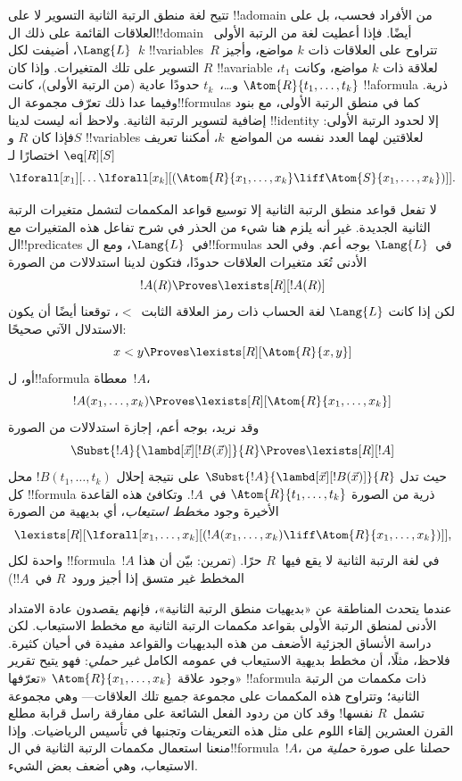 \documentclass[../../../include/open-logic-section]{subfiles}
\begin{document}


تتيح لغة منطق الرتبة الثانية التسوير لا على !!a{domain} من الأفراد
فحسب، بل على العلاقات القائمة على ذلك ال!!{domain} أيضًا. فإذا أعطيت
لغة من الرتبة الأولى~$\Lang{L}$، أضيفت لكل~$k$ !!{variable}s~$R$
تتراوح على العلاقات ذات $k$ مواضع، وأجيز التسوير على تلك المتغيرات. وإذا
كان $R$ !!a{variable} لعلاقة ذات $k$ مواضع، وكانت $t_1$، و\dots،~$t_k$
حدودًا عادية (من الرتبة الأولى)، كانت $\Atom{R}{t_1,\dots,t_k}$
!!a{formula} ذرية. وفيما عدا ذلك تعرّف مجموعة ال!!{formula}s كما في
منطق الرتبة الأولى، مع بنود إضافية لتسوير الرتبة الثانية. ولاحظ أنه
ليست لدينا !!{identity} إلا لحدود الرتبة الأولى: فإذا كان $R$ و$S$
!!{variable}s لعلاقتين لهما العدد نفسه من المواضع~$k$، أمكننا تعريف
$\eq[R][S]$ اختصارًا لـ
\[
\lforall[x_1][\dots\lforall[x_k][(\Atom{R}{x_1, \dots, x_k} \liff
  \Atom{S}{x_1, \dots, x_k})]].
\]

لا تفعل قواعد منطق الرتبة الثانية إلا توسيع قواعد المكممات لتشمل
متغيرات الرتبة الثانية الجديدة. غير أنه يلزم هنا شيء من الحذر في شرح
تفاعل هذه المتغيرات مع ال!!{predicate}s في~$\Lang{L}$، ومع
ال!!{formula}s في~$\Lang{L}$ بوجه أعم. وفي الحد الأدنى تُعَد متغيرات
العلاقات حدودًا، فتكون لدينا استدلالات من الصورة
\[
!A(R) \Proves \lexists[R][!A(R)]
\]
لكن إذا كانت $\Lang{L}$ لغة الحساب ذات رمز العلاقة الثابت~$<$، توقعنا
أيضًا أن يكون الاستدلال الآتي صحيحًا:
\[
x < y \Proves \lexists[R][\Atom{R}{x,y}]
\]
أو، ل!!a{formula} معطاة~$!A$،
\[
!A(x_1, \dots, x_k) \Proves \lexists[R][\Atom{R}{x_1,\dots,x_k}]
\]
وقد نريد، بوجه أعم، إجازة استدلالات من الصورة
\[
\Subst{!A}{\lambd[\vec x][!B(\vec x)]}{R} \Proves
\lexists[R][!A]
\]
حيث تدل $\Subst{!A}{\lambd[\vec x][!B(\vec x)]}{R}$ على نتيجة إحلال
$!B(t_1, \dots, t_k)$ محل كل !!{formula} ذرية من الصورة
$\Atom{R}{t_1,\dots,t_k}$ في~$!A$. وتكافئ هذه القاعدة الأخيرة وجود
{\em مخطط استيعاب}، أي بديهية من الصورة
\[
\lexists[R][\lforall[x_1, \dots, x_k][(!A(x_1, \dots, x_k) \liff
\Atom{R}{x_1, \dots, x_k})]],
\]
واحدة لكل !!{formula}~$!A$ في لغة الرتبة الثانية لا يقع فيها~$R$
حرًا. (تمرين: بيّن أن هذا المخطط غير متسق إذا أجيز ورود~$R$ في~$!A$!)

عندما يتحدث المناطقة عن «بديهيات منطق الرتبة الثانية»، فإنهم يقصدون
عادة الامتداد الأدنى لمنطق الرتبة الأولى بقواعد مكممات الرتبة الثانية
مع مخطط الاستيعاب. لكن دراسة الأنساق الجزئية الأضعف من هذه البديهيات
والقواعد مفيدة في أحيان كثيرة. فلاحظ، مثلًا، أن مخطط بديهية الاستيعاب
في عمومه الكامل \emph{غير حملي}: فهو يتيح تقرير وجود علاقة
$\Atom{R}{x_1, \dots, x_k}$ «تعرّفها» !!a{formula} ذات مكممات من
الرتبة الثانية؛ وتتراوح هذه المكممات على مجموعة جميع تلك العلاقات---
وهي مجموعة تشمل~$R$ نفسها!{} وقد كان من ردود الفعل الشائعة على مفارقة
راسل قرابة مطلع القرن العشرين إلقاء اللوم على مثل هذه التعريفات
وتجنبها في تأسيس الرياضيات. وإذا منعنا استعمال مكممات الرتبة الثانية
في ال!!{formula}~$!A$، حصلنا على صورة {\em حملية} من الاستيعاب، وهي
أضعف بعض الشيء.
\end{document}
